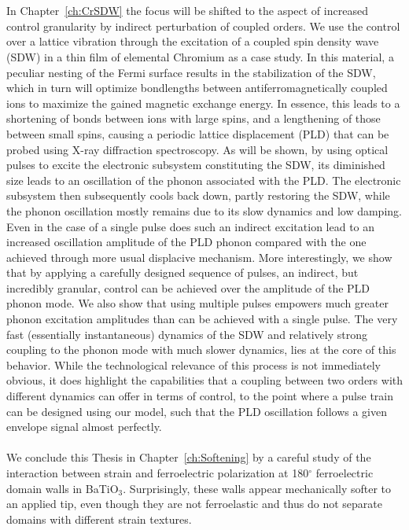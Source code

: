 \\\\
In Chapter~\ref{ch:CrSDW} the focus will be shifted to the aspect of increased control granularity by indirect perturbation of coupled orders.
We use the control over a lattice vibration through the excitation of a coupled spin density wave (SDW) in a thin film of elemental Chromium as a case study.
In this material, a peculiar nesting of the Fermi surface results in the stabilization of the SDW, which in turn will optimize bondlengths between antiferromagnetically coupled ions to maximize the gained magnetic exchange energy.
In essence, this leads to a shortening of bonds between ions with large spins, and a lengthening of those between small spins, causing a periodic lattice displacement (PLD) that can be probed using X-ray diffraction spectroscopy.
As will be shown, by using optical pulses to excite the electronic subsystem constituting the SDW, its diminished size leads to an oscillation of the phonon associated with the PLD.
The electronic subsystem then subsequently cools back down, partly restoring the SDW, while the phonon oscillation mostly remains due to its slow dynamics and low damping.
Even in the case of a single pulse does such an indirect excitation lead to an increased oscillation amplitude of the PLD phonon compared with the one achieved through more usual displacive mechanism.
More interestingly, we show that by applying a carefully designed sequence of pulses, an indirect, but incredibly granular, control can be achieved over the amplitude of the PLD phonon mode.
We also show that using multiple pulses empowers much greater phonon excitation amplitudes than can be achieved with a single pulse.
The very fast (essentially instantaneous) dynamics of the SDW and relatively strong coupling to the phonon mode with much slower dynamics, lies at the core of this behavior.
While the technological relevance of this process is not immediately obvious, it does highlight the capabilities that a coupling between two orders with different dynamics can offer in terms of control, to the point where a pulse train can be designed using our model, such that the PLD oscillation follows a given envelope signal almost perfectly.
\\\\
We conclude this Thesis in Chapter~\ref{ch:Softening} by a careful study of the interaction between strain and ferroelectric polarization at 180$^\circ$ ferroelectric domain walls in BaTiO$_3$.
Surprisingly, these walls appear mechanically softer to an applied tip, even though they are not ferroelastic and thus do not separate domains with different strain textures.
